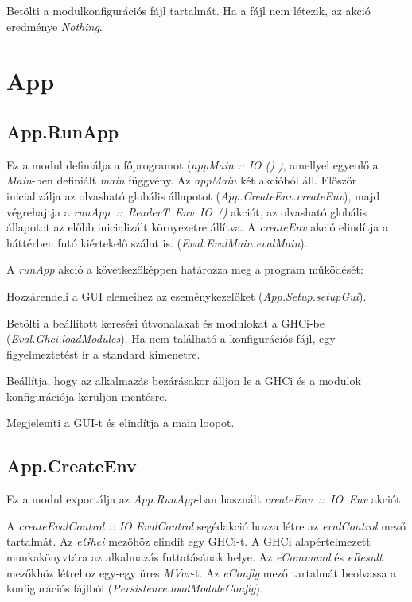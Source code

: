 Betölti a modulkonfigurációs fájl tartalmát. Ha a fájl nem létezik, az akció eredménye \textit{Nothing}.

\section{App}

\subsection{App.RunApp}

Ez a modul definiálja a főprogramot (\textit{appMain :: IO () )}, amellyel egyenlő a \textit{Main}-ben definiált \textit{main} függvény. Az \textit{appMain} két akcióból áll. Először inicializálja az olvasható globális állapotot (\textit{App.CreateEnv.createEnv}), majd végrehajtja a \mbox{\textit{runApp :: ReaderT Env IO ()}} akciót, az olvasható globális állapotot az előbb inicializált környezetre állítva. A 
\textit{createEnv} akció elindítja a háttérben futó kiértekelő szálat is. (\textit{Eval.EvalMain.evalMain}).

A \textit{runApp} akció a következőképpen határozza meg a program működését:
\begin{compactenum}
	\item Hozzárendeli a GUI elemeihez az eseménykezelőket (\textit{App.Setup.setupGui}).
	\item Betölti a beállított keresési útvonalakat és modulokat a GHCi-be (\textit{Eval.Ghci.loadModules}). Ha nem található a konfigurációs fájl, egy figyelmeztetést ír a standard kimenetre.
	\item Beállítja, hogy az alkalmazás bezárásakor álljon le a GHCi és a modulok konfigurációja kerüljön mentésre.
	\item Megjeleníti a GUI-t és elindítja a main loopot. 
\end{compactenum}

\subsection{App.CreateEnv}

Ez a modul exportálja az \textit{App.RunApp}-ban használt \mbox{\textit{createEnv :: IO Env}} akciót.

A \textit{createEvalControl :: IO EvalControl} segédakció hozza létre az \textit{evalControl} mező tartalmát. Az \textit{eGhci} mezőhöz elindít egy GHCi-t. A GHCi alapértelmezett munkakönyvtára az alkalmazás futtatásának helye. Az \textit{eCommand} és \textit{eResult} mezőkhöz létrehoz egy-egy üres \textit{MVar}-t. Az \textit{eConfig} mező tartalmát beolvassa a konfigurációs fájlból (\textit{Persistence.loadModuleConfig}).

